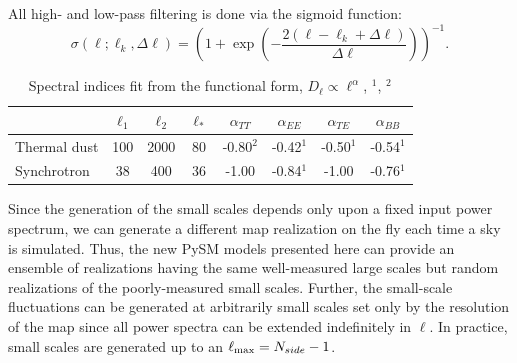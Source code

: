 All high- and low-pass filtering is done via the sigmoid function: 
\begin{equation}
\sigma (\ell; \ell_k, \Delta \ell ) = \left( 1+  \exp \left( - \frac{2 (\ell - \ell_k  +\Delta \ell ) }{\Delta \ell}\right)   \right)^{-1}.
\end{equation}
 

\begin{table}[]
    \centering
    \footnotesize
    \begin{tabular}{lccccccc}
    \toprule 
   &   $ \ell_1  $&$\ell_2$   &$\ell_* $& $\alpha_{TT}$  & $\alpha_{EE}$ &$\alpha_{TE}$ &$\alpha_{BB}$ \\
   \midrule  
   Thermal dust & 100 & 2000 & 80 & -0.80$^2$ & -0.42$^{1}$& -0.50$^{1}$ & -0.54$^{1}$ \\ 
   Synchrotron & 38 & 400 & 36 &  -1.00& -0.84$^{1}$ & -1.00 & -0.76$^{1}$ \\
   \bottomrule
    \end{tabular}
    \caption{Spectral indices fit from the functional form,  $D_{\ell}\propto \ell^{\alpha}$, $^1$\citet{planck2016-l11A}, $^2$\citet{mivilledeschene:2016}}
    \label{tab:smallscale_par}
\end{table}



Since the generation of the small scales depends only upon a fixed input power spectrum, we can generate a different map realization on the fly each time a sky is simulated. Thus, the new PySM models presented here can provide an ensemble of realizations having the same well-measured large scales but random realizations of the poorly-measured small scales. Further, the small-scale fluctuations can be generated at arbitrarily small scales set only by the resolution of the map since all power spectra can be extended indefinitely in $\ell$. In practice, small scales are generated up to an $\ell_{\rm max} = N_{side}-1$.

